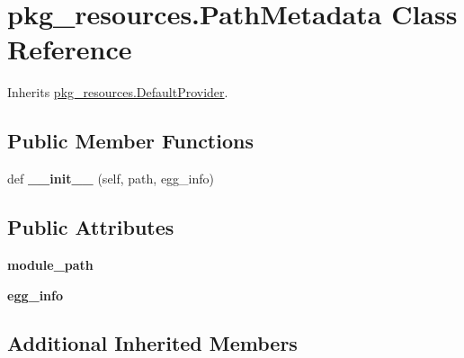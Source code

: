 \hypertarget{classpkg__resources_1_1_path_metadata}{}\section{pkg\+\_\+resources.\+Path\+Metadata Class Reference}
\label{classpkg__resources_1_1_path_metadata}


Inherits \hyperlink{classpkg__resources_1_1_default_provider}{pkg\+\_\+resources.\+Default\+Provider}.

\subsection*{Public Member Functions}
\begin{DoxyCompactItemize}
\item 
\mbox{\label{classpkg__resources_1_1_path_metadata_a42afa04f667e8f792f431ec4eba76a5b}} 
def {\bfseries \+\_\+\+\_\+init\+\_\+\+\_\+} (self, path, egg\+\_\+info)
\end{DoxyCompactItemize}
\subsection*{Public Attributes}
\begin{DoxyCompactItemize}
\item 
\mbox{\label{classpkg__resources_1_1_path_metadata_a32d4f91934149b639e6b3e88e802bd9f}} 
{\bfseries module\+\_\+path}
\item 
\mbox{\label{classpkg__resources_1_1_path_metadata_a61a445362a417dfb470ebee020a73762}} 
{\bfseries egg\+\_\+info}
\end{DoxyCompactItemize}
\subsection*{Additional Inherited Members}


